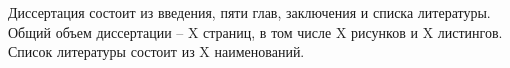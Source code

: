 Диссертация состоит из введения, пяти глав, заключения и списка литературы.
Общий объем диссертации -- X страниц, в том числе X рисунков и X листингов.
Список литературы состоит из X наименований.